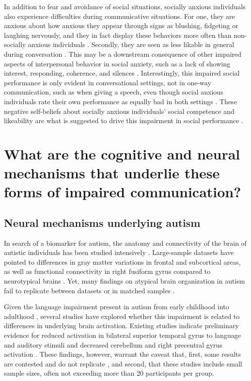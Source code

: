 In addition to fear and avoidance of social situations, socially anxious individuals also experience difficulties during communicative situations. For one, they are anxious about how anxious they appear through signs as blushing, fidgeting or laughing nervously, and they in fact display these behaviors more often than non-socially anxious individuals \citep{voncken2008JAD}. Secondly, they are seen as less likable in general during conversation \citep{alden1995,creed1998,meleshko1993,voncken2008BJCP}. This may be a downstream consequence of other impaired aspects of interpersonal behavior in social anxiety, such as a lack of showing interest, responding, coherence, and silences \citep{voncken2008JAD}. Interestingly, this impaired social performance is only evident in conversational settings, not in one-way communication, such as when giving a speech, even though social anxious individuals rate their own performance as equally bad in both settings \citep{voncken2008JAD}. These negative self-beliefs about socially anxious individuals’ social competence and likeability are what is suggested to drive this impairment in social performance \citep{voncken2010}.

\section*{What are the cognitive and neural mechanisms that underlie these forms of impaired communication?}

\subsection*{Neural mechanisms underlying autism}

In search of a biomarker for autism, the anatomy and connectivity of the brain of autistic individuals has been studied intensively \citep[for a review]{pretzsch2022}. Large-sample datasets have pointed to differences in gray matter variations in frontal and subcortical areas, as well as functional connectivity in right fusiform gyrus compared to neurotypical brains \citep{mei2020,oblong2023}. Yet, many findings on atypical brain organization in autism fail to replicate between datasets or in matched samples \citep{he2020,koldewyn2014,mei2024,riddle2017}. 

Given the language impairment present in autism from early childhood into adulthood \citep{velikonja2019}, several studies have explored whether this impairment is related to differences in underlying brain activation. Existing studies indicate preliminary evidence for reduced activation in bilateral superior temporal gyrus to language and auditory stimuli and decreased cerebellum and right precentral gyrus activation \citep[for reviews]{groen2008,philip2012}. These findings, however, warrant the caveat that, first, some results are contested and do not replicate \citep{tryfon2018}, and second, that these studies include small sample sizes, often not exceeding more than 20 participants per group.

